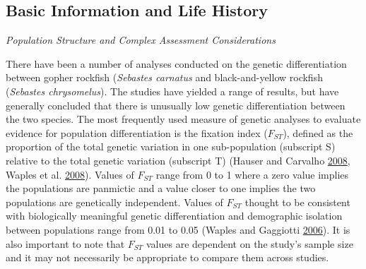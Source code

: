 \documentclass[12pt,]{article}
\begin{document}
\subsection{Basic Information and Life
History}\label{basic-information-and-life-history}

\emph{Population Structure and Complex Assessment Considerations}

There have been a number of analyses conducted on the genetic
differentiation between gopher rockfish (\emph{Sebastes carnatus} and
black-and-yellow rockfish (\emph{Sebastes chrysomelus}). The studies
have yielded a range of results, but have generally concluded that there
is unusually low genetic differentiation between the two species. The
most frequently used measure of genetic analyses to evaluate evidence
for population differentiation is the fixation index (\(F_{ST}\)),
defined as the proportion of the total genetic variation in one
sub-population (subscript S) relative to the total genetic variation
(subscript T) (Hauser and Carvalho
\protect\hyperlink{ref-Hauser2008}{2008}, Waples et al.
\protect\hyperlink{ref-Waples2008}{2008}). Values of \(F_{ST}\) range
from 0 to 1 where a zero value implies the populations are panmictic and
a value closer to one implies the two populations are genetically
independent. Values of \(F_{ST}\) thought to be consistent with
biologically meaningful genetic differentiation and demographic
isolation between populations range from 0.01 to 0.05 (Waples and
Gaggiotti \protect\hyperlink{ref-Waples2006}{2006}). It is also
important to note that \(F_{ST}\) values are dependent on the study's
sample size and it may not necessarily be appropriate to compare them
across studies.
\end{document}
